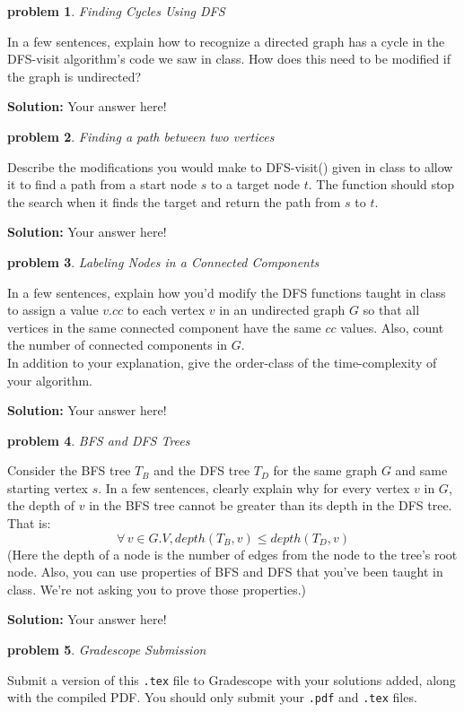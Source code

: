 \documentclass[10pt]{article}
\newcommand{\solution}[1]{\color{blue}\hfill\break\noindent\textbf{Solution:} #1\color{black}}
\newtheorem{problem}{\sc\color{cit}problem}
\begin{document}
\begin{problem} Finding Cycles Using DFS  \end{problem}

In a few sentences, explain how to recognize a directed graph has a cycle in the DFS-visit algorithm's code we saw in class. How does this need to be modified if the graph is undirected?

\solution{
    Your answer here!
}


\begin{problem} Finding a path between two vertices \end{problem}

Describe the modifications you would make to DFS-visit() given in class to allow it to find a path from a start node $s$ to a target node $t$. The function should stop the search when it finds the target and return the path from $s$ to $t$.

\solution{
    Your answer here!
}

\begin{problem} Labeling Nodes in a Connected Components \end{problem}

In a few sentences, explain how you'd modify the DFS functions taught in class to assign a value $v.cc$ to each vertex $v$ in an undirected graph $G$ so that all vertices in the same connected component have the same $cc$ values.  Also, count the number of connected components in $G$. \\
In addition to your explanation, give the order-class of the time-complexity of your algorithm.

\solution{
    Your answer here!
}


\begin{problem} BFS and DFS Trees \end{problem}

Consider the BFS tree $T_B$ and the DFS tree $T_D$ for the same graph $G$ and same starting vertex $s$.
In a few sentences, clearly explain why for every vertex $v$ in $G$, the depth of $v$ in the BFS tree cannot be greater than its depth in the DFS tree. That is:
$$ \forall \, v \in G.V, depth(T_B, v) \leq depth(T_D, v)$$
(Here the depth of a node is the number of edges from the node to the tree's root node. Also, you can use properties of BFS and DFS that you've been taught in class. We're not asking you to prove those properties.)

\solution{
    Your answer here!
}


\begin{problem} Gradescope Submission \end{problem}
Submit a version of this \verb|.tex| file to Gradescope with your solutions added, along with the compiled PDF.  You should only submit your \verb|.pdf| and \verb|.tex| files.
\end{document}
